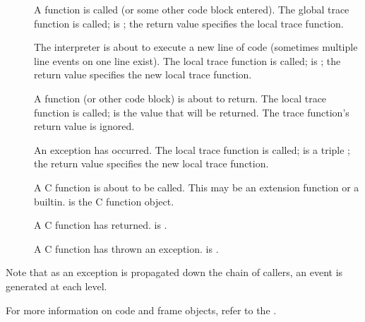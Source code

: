 \begin{description}

\item[]
A function is called (or some other code block entered).  The global
trace function is called;  is ;
the return value specifies the local trace function.

\item[]
The interpreter is about to execute a new line of code (sometimes
multiple line events on one line exist).  The local trace function is
called;  is ; the return value specifies the new
local trace function.

\item[]
A function (or other code block) is about to return.  The local trace
function is called;  is the value that will be returned.  The
trace function's return value is ignored.

\item[]
An exception has occurred.  The local trace function is called;
 is a triple ; the return value specifies the new local trace
function.

\item[]
A C function is about to be called.  This may be an extension function
or a builtin.   is the C function object.

\item[]
A C function has returned.  is .

\item[]
A C function has thrown an exception.   is .

\end{description}

Note that as an exception is propagated down the chain of callers, an
 event is generated at each level.

For more information on code and frame objects, refer to the
.
